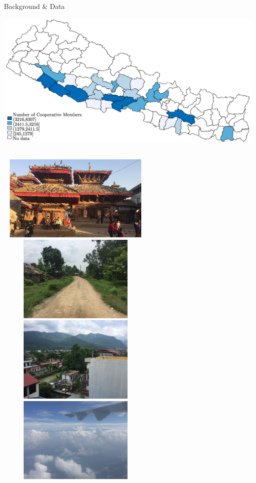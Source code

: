 \documentclass[aspectratio=169]{beamer}
\begin{document}
\begin{frame}{Background \& Data}
    \begin{center}
        \includegraphics[width=.9\textwidth,trim=4 4 4 4,clip]{StudyMap.png}
    \end{center}
\end{frame}

\begin{frame}
\begin{columns}[t]
\centering
\includegraphics[width=7.7cm,height=4.2cm]{travel1.jpg}\\
\includegraphics[width=7.7cm,height=4.2cm]{travel3.jpg}
\centering
\includegraphics[width=7.7cm,height=4.2cm]{travel2.jpg}\\
\includegraphics[width=7.7cm,height=4.2cm]{travel4.jpg}
\end{columns}
\end{frame}
\end{document}
